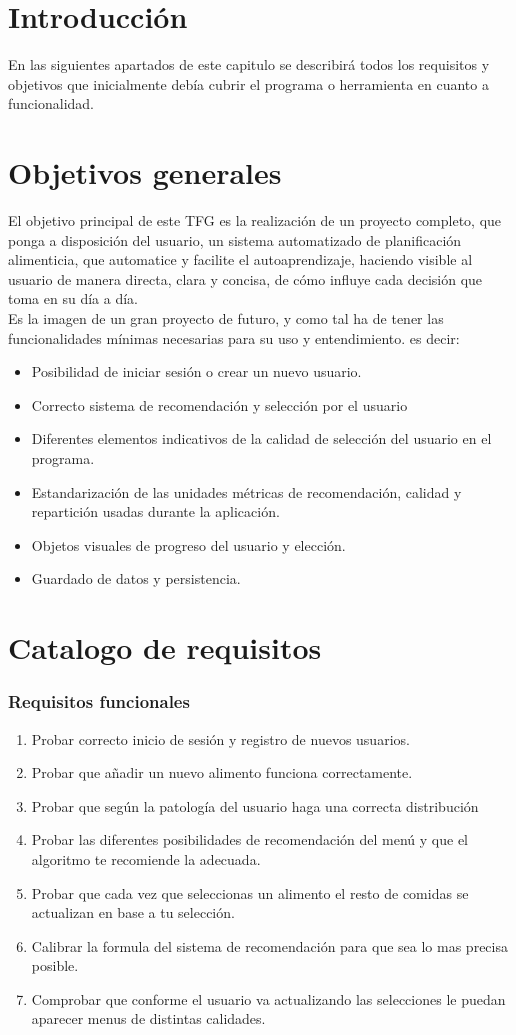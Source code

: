 
\section{Introducción}
En las siguientes apartados de este capitulo se describirá todos los requisitos y objetivos que inicialmente debía cubrir el programa o herramienta en cuanto a funcionalidad.
\section{Objetivos generales}
El objetivo principal de este TFG es la realización de un proyecto completo, que ponga a disposición del usuario, un sistema automatizado de planificación alimenticia, que automatice y facilite el autoaprendizaje, haciendo visible al usuario de manera directa, clara y concisa, de cómo influye cada decisión que toma en su día a día.\\
Es la imagen de un gran proyecto de futuro, y como tal ha de tener las funcionalidades mínimas necesarias para su uso y entendimiento. es decir:
\begin{itemize}
\item Posibilidad de iniciar sesión o crear un nuevo usuario.
\item Correcto sistema de recomendación y selección por el usuario
\item Diferentes elementos indicativos de la calidad de selección del usuario en el programa.
\item Estandarización de las unidades métricas de recomendación, calidad y repartición usadas durante la aplicación.
\item Objetos visuales de progreso del usuario y elección.
\item Guardado de datos y persistencia.
\end{itemize}
\section{Catalogo de requisitos}
\subsubsection{Requisitos funcionales}
\begin{enumerate}
\item Probar correcto inicio de sesión y registro de nuevos usuarios.
\item Probar que añadir un nuevo alimento funciona correctamente.
\item Probar que según la patología del usuario haga una correcta distribución
\item Probar las diferentes posibilidades de recomendación del menú y que el algoritmo te recomiende la adecuada.
\item Probar que cada vez que seleccionas un alimento el resto de comidas se actualizan en base a tu selección.
\item Calibrar la formula del sistema de recomendación para que sea lo mas precisa posible.
\item Comprobar que conforme el usuario va actualizando las selecciones le puedan aparecer menus de distintas calidades.
\end{enumerate}
